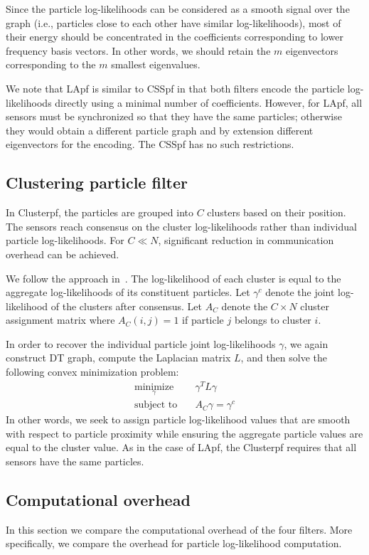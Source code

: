 \documentclass[10pt,letterpaper,final]{article}
\begin{document}
Since the particle log-likelihoods can be considered as a smooth signal over the graph (i.e., particles close to each other have similar log-likelihoods), most of their energy should be concentrated in the coefficients corresponding to lower frequency basis vectors. In other words, we should retain the $m$ eigenvectors corresponding to the $m$ smallest eigenvalues. 

We note that LApf is similar to CSSpf in that both filters encode the particle log-likelihoods directly using a minimal number of coefficients. However, for LApf, all sensors must be synchronized so that they have the same particles; otherwise they would obtain a different particle graph and by extension different eigenvectors for the encoding. The CSSpf has no such restrictions. 

\subsection{Clustering particle filter}
In Clusterpf, the particles are grouped into $C$ clusters based on their position. The sensors reach consensus on the cluster log-likelihoods rather than individual particle log-likelihoods. For $C \ll N$, significant reduction in communication overhead can be achieved. 

We follow the approach in~\cite{Hlinka2012}. The log-likelihood of each cluster is equal to the aggregate log-likelihoods of its constituent particles. Let $\gamma^c$ denote the joint log-likelihood of the clusters after consensus. Let $A_C$ denote the $C \times N$ cluster assignment matrix where $A_C(i,j)=1$ if particle $j$ belongs to cluster $i$. 

In order to recover the individual particle joint log-likelihoods $\gamma$, we again construct DT graph, compute the Laplacian matrix $L$, and then solve the following convex minimization problem:
\begin{align}
\underset{\gamma}{\text{minimize}}& \quad \gamma^TL\gamma  \\
\text{subject to}& \quad A_C\gamma = \gamma^c
\end{align}
In other words, we seek to assign particle log-likelihood values that are smooth with respect to particle proximity while ensuring the aggregate particle values are equal to the cluster value. As in the case of LApf, the Clusterpf requires that all sensors have the same particles. 

\subsection{Computational overhead}
In this section we compare the computational overhead of the four filters. More specifically, we compare the overhead for particle log-likelihood computation.
\end{document}
